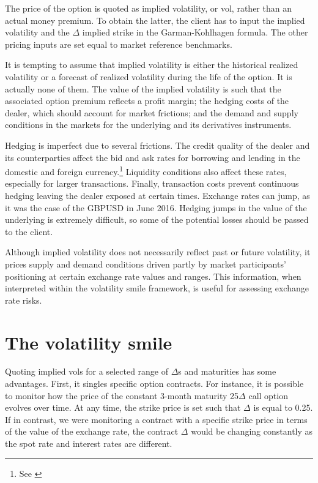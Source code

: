\documentclass[]{book}
\let\rmarkdownfootnote\footnote%
\def\footnote{\protect\rmarkdownfootnote}
\theoremstyle{definition}
\theoremstyle{definition}
\theoremstyle{definition}
\theoremstyle{remark}
\begin{document}
The price of the option is quoted as implied volatility, or vol, rather
than an actual money premium. To obtain the latter, the client has to
input the implied volatility and the \(\Delta\) implied strike in the
Garman-Kohlhagen formula. The other pricing inputs are set equal to
market reference benchmarks.

It is tempting to assume that implied volatility is either the
historical realized volatility or a forecast of realized volatility
during the life of the option. It is actually none of them. The value of
the implied volatility is such that the associated option premium
reflects a profit margin; the hedging costs of the dealer, which should
account for market frictions; and the demand and supply conditions in
the markets for the underlying and its derivatives instruments.

Hedging is imperfect due to several frictions. The credit quality of the
dealer and its counterparties affect the bid and ask rates for borrowing
and lending in the domestic and foreign currency.\footnote{See
  \citet{Lou2015}} Liquidity conditions also affect these rates,
especially for larger transactions. Finally, transaction costs prevent
continuous hedging leaving the dealer exposed at certain times. Exchange
rates can jump, as it was the case of the GBPUSD in June 2016. Hedging
jumps in the value of the underlying is extremely difficult, so some of
the potential losses should be passed to the client.

Although implied volatility does not necessarily reflect past or future
volatility, it prices supply and demand conditions driven partly by
market participants' positioning at certain exchange rate values and
ranges. This information, when interpreted within the volatility smile
framework, is useful for assessing exchange rate risks.

\chapter{The volatility smile}\label{the-volatility-smile}

Quoting implied vols for a selected range of \(\Delta\)s and maturities
has some advantages. First, it singles specific option contracts. For
instance, it is possible to monitor how the price of the constant
3-month maturity 25\(\Delta\) call option evolves over time. At any
time, the strike price is set such that \(\Delta\) is equal to 0.25. If
in contrast, we were monitoring a contract with a specific strike price
in terms of the value of the exchange rate, the contract \(\Delta\)
would be changing constantly as the spot rate and interest rates are
different.
\end{document}
